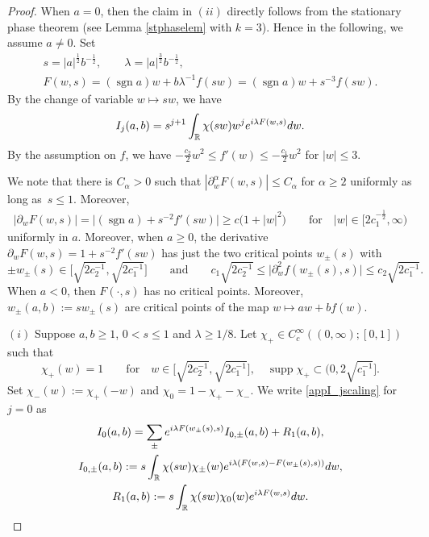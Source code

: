 \documentclass[10pt,a4paper]{article}
\numberwithin{equation}{section}
\def\R{\mathbb{R}}%
\DeclareMathOperator{\supp}{supp}%
\DeclareMathOperator{\sgn}{sgn}%
\def\a{\alpha}
\def\l{\lambda}
\def\pa{\partial}
\begin{document}
\begin{proof}
When $a=0$, then the claim in $(ii)$ directly follows from the stationary phase theorem (see Lemma \ref{stphaselem} with $k=3$). Hence in the following, we assume $a\neq 0$.
Set
\begin{gather*}
s=|a|^{\frac{1}{2}}b^{-\frac{1}{2}},\qquad \l=|a|^{\frac{3}{2}}b^{-\frac{1}{2}},\\ F(w,s)=(\sgn a)w+b\l^{-1}f(sw)=(\sgn a)w+s^{-3}f(sw).
\end{gather*}
By the change of variable $w\mapsto sw$, we have
\begin{align}\label{appI_jscaling}
I_j(a,b)=s^{j+1}\int_{\R}\chi(sw)w^j{\rm e}^{{\rm i}\l F(w,s)}{\rm d}w.
\end{align}
By the assumption on $f$, we have $-\frac{c_2}{2}w^2\leq f'(w)\leq -\frac{c_1}{2}w^2$ for $|w|\leq 3$.

We note that there is $C_{\a}>0$ such that $|\pa_{w}^{\a}F(w,s)|\leq C_{\a}$ for $\a\geq 2$ uniformly as long as~${s\leq 1}$. Moreover,
\begin{align}\label{apprescalef'}
|\pa_wF(w,s)|=\big|(\sgn a)+s^{-2}f'(sw)\big|\geq c\bigl(1+|w|^2\bigr)\qquad \text{for}\quad |w|\in \bigl[2c_1^{-\frac{1}{2}},\infty\bigr)
\end{align}
uniformly in $a$. Moreover, when $a\geq 0$, the derivative $\pa_wF(w,s)=1+s^{-2}f'(sw)$ has just the two critical points $w_{\pm}(s)$ with
\[
\pm w_{\pm}(s)\in \bigl[\sqrt{2c_2^{-1}},\sqrt{2c_1^{-1}}\bigr] \qquad \text{and} \qquad c_1 \sqrt{2c_2^{-1}}\leq\big|\pa_w^2f(w_{\pm}(s),s)\big| \leq c_2 \sqrt{2c_1^{-1}}.
\]
 When $a<0$, then $F(\cdot,s)$ has no critical points. Moreover, $w_{\pm}(a,b):=sw_{\pm}(s)$ are critical points of the map $w\mapsto aw+bf(w)$.

 $(i)$ Suppose $a,b\geq 1$, $0<s\leq 1$ and $\l\geq 1/8$.
Let $\chi_+\in C_c^{\infty}((0,\infty);[0,1])$ such that
\[
\chi_+(w)=1 \qquad \text{for} \quad w\in \bigl[\sqrt{2c_2^{-1}},\sqrt{2c_1^{-1}}\bigr], \quad \supp \chi_+\subset \bigl(0,2\sqrt{c_1^{-1}}\bigr].
\]
 Set $\chi_-(w):=\chi_+(-w)$ and $\chi_0=1-\chi_+-\chi_-$.
We write \eqref{appI_jscaling} for $j=0$ as
\begin{gather*}
I_0(a,b)= \sum_{\pm}{\rm e}^{{\rm i}\l F(w_{\pm}(s),s)}I_{0,\pm}(a,b)+R_1(a,b),\\
I_{0,\pm}(a,b):=s\int_{\R}\chi(sw)\chi_{\pm}(w){\rm e}^{{\rm i}\l (F(w,s)-F(w_{\pm}(s),s))}{\rm d}w,\\
 R_1(a,b):=s\int_{\R}\chi(sw)\chi_{0}(w){\rm e}^{{\rm i}\l F(w,s)}{\rm d}w.
\end{gather*}


\end{proof}
\end{document}
